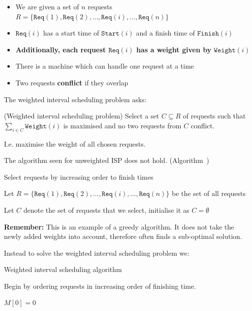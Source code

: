 \documentclass{article}
\begin{document}
\begin{itemize}
  \item We are given a set of $n$ requests $R = \{ \texttt{Req}(1), \texttt{Req}(2), \ldots, \texttt{Req}(i), \ldots, \texttt{Req}(n)\} $
  \item $\texttt{Req}(i)$ has a start time of $\texttt{Start} (i)$ and a finish time of $\texttt{Finish} (i)$
        \item \textbf{Additionally, each request $\texttt{Req}(i)$ has a weight given by $\texttt{Weight}(i)$}
  \item There is a machine which can handle one request at a time
  \item Two requests \textbf{conflict} if they overlap
\end{itemize}

The weighted interval scheduling problem asks:

\begin{problem}(Weighted interval scheduling problem)
  Select a set $C \subseteq R$ of requests such that $\sum_{i\in C}\texttt{Weight} (i)$ is maximised and no two requests from $C$ conflict.
\end{problem}

I.e. maximise the weight of all chosen requests.

The algorithm seen for unweighted ISP does not hold. (Algorithm~)

\begin{algorithm}
  \caption{Select requests by increasing order to finish times}
  Let $R = \{ \texttt{Req}(1), \texttt{Req}(2), \ldots, \texttt{Req}(i), \ldots, \texttt{Req}(n)\} $ be the set of all requests

  Let $C$ denote the set of requests that we select, initialise it as $C = \emptyset $

\end{algorithm}
\textbf{Remember: } This is an example of a greedy algorithm. It does not take the newly added weights into account, therefore often finds a sub-optimal solution.

Instead to solve the weighted interval scheduling problem we:

\begin{algorithm}
  \caption{Weighted interval scheduling algorithm}
  Begin by ordering requests in increasing order of finishing time.

  $M[0] = 0$

\end{algorithm}
\end{document}
